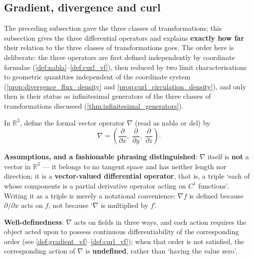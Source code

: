 \subsection{Gradient, divergence and curl}\label{subsec:grad_div_curl}

The preceding subsection gave the three classes of transformations; this subsection gives the three differential operators and explains \textbf{exactly how far} their relation to the three classes of transformations goes. The order here is deliberate: the three operators are first defined independently by coordinate formulae (\cref{def:nabla}--\cref{def:curl_vf}), then reduced by two limit characterisations to geometric quantities independent of the coordinate system (\cref{prop:divergence_flux_density} and \cref{prop:curl_circulation_density}), and only then is their status as infinitesimal generators of the three classes of transformations discussed (\cref{thm:infinitesimal_generators}).

\begin{definition}\label{def:nabla}
In $\mathbb{R}^3$, define the formal vector operator $\nabla$ (read as nabla or del) by
\[
\nabla = \left( \frac{\partial}{\partial x},\; \frac{\partial}{\partial y},\; \frac{\partial}{\partial z} \right).
\]

\textbf{Assumptions, and a fashionable phrasing distinguished}: $\nabla$ itself is \textbf{not} a vector in $\mathbb R^3$ --- it belongs to no tangent space and has neither length nor direction; it is a \textbf{vector-valued differential operator}, that is, a triple `each of whose components is a partial derivative operator acting on $C^1$ functions'. Writing it as a triple is merely a notational convenience: $\nabla f$ is defined because $\partial/\partial x$ acts on $f$, not because `$\nabla$ is multiplied by $f$'.

\textbf{Well-definedness}: $\nabla$ acts on fields in three ways, and each action requires the object acted upon to possess continuous differentiability of the corresponding order (see \cref{def:gradient_vf}--\cref{def:curl_vf}); when that order is not satisfied, the corresponding action of $\nabla$ is \textbf{undefined}, rather than `having the value zero'.
\end{definition}

